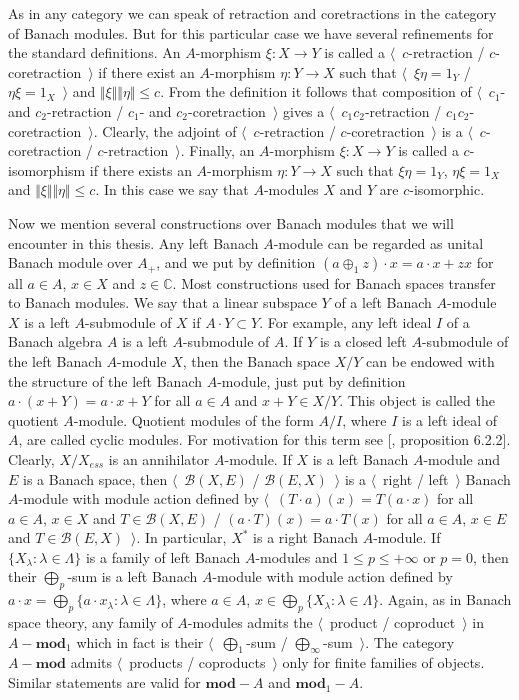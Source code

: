 As in any category we can speak of retraction and	 coretractions in the category of Banach modules. But for this particular case we have several refinements for the standard definitions. An $A$-morphism $\xi:X\to Y$ is called a $\langle$~$c$-retraction / $c$-coretraction~$\rangle$ if there exist an $A$-morphism $\eta:Y\to X$ such that $\langle$~$\xi\eta=1_Y$ / $\eta\xi=1_X$~$\rangle$ and $\Vert\xi\Vert\Vert\eta\Vert\leq c$. From the definition it follows that composition of $\langle$~$c_1$- and $c_2$-retraction / $c_1$- and $c_2$-coretraction~$\rangle$ gives a $\langle$~$c_1c_2$-retraction / $c_1c_2$-coretraction~$\rangle$. Clearly, the adjoint of $\langle$~$c$-retraction / $c$-coretraction~$\rangle$ is a $\langle$~$c$-coretraction / $c$-retraction~$\rangle$. Finally, an $A$-morphism $\xi:X\to Y$ is called a $c$-isomorphism if there exists an $A$-morphism $\eta:Y\to X$ such that $\xi\eta=1_Y$, $\eta\xi=1_X$ and $\Vert\xi\Vert\Vert\eta\Vert\leq c$. In this case we say that $A$-modules $X$ and $Y$ are $c$-isomorphic.

Now we mention several constructions over Banach modules that we will encounter in this thesis.  Any left Banach $A$-module can be regarded as unital Banach module over $A_+$, and we put by definition $(a\oplus_1 z)\cdot x=a\cdot x+zx$ for all $a\in A$, $x\in X$ and $z\in\mathbb{C}$. Most constructions used for Banach spaces transfer to Banach modules.  We say that a linear subspace $ Y$ of a left Banach $A$-module $X$ is a left $A$-submodule of $X$ if $A\cdot Y\subset Y$. For example, any left ideal $I$ of a Banach algebra $A$ is a left $A$-submodule of $A$. If $Y$ is a closed left $A$-submodule of the left Banach $A$-module $X$, then the Banach space $X/Y$ can be endowed with the structure of the left Banach $A$-module, just put by definition $a\cdot(x+Y)=a\cdot x+Y$ for all $a\in A$ and $x+Y\in X/Y$. This object is called the quotient $A$-module.  Quotient modules of the form $A/I$, where $I$ is a left ideal of $A$, are called cyclic modules. For motivation for this term see [\cite{HelBanLocConvAlg}, proposition 6.2.2]. Clearly, $X/X_{ess}$ is an annihilator $A$-module. If $X$ is a left Banach $A$-module and $E$ is a Banach space, then $\langle$~$\mathcal{B}(X,E)$ / $\mathcal{B}(E,X)$~$\rangle$ is a $\langle$~right / left~$\rangle$ Banach $A$-module with module action defined by $\langle$~$(T\cdot a)(x)=T(a\cdot x)$ for all $a\in A$, $x\in X$ and $T\in\mathcal{B}(X, E)$ / $(a\cdot T)(x)=a\cdot T(x)$ for all $a\in A$, $x\in E$ and $T\in\mathcal{B}(E, X)$~$\rangle$. In particular, $X^*$ is a right Banach $A$-module. If $\{X_\lambda:\lambda\in\Lambda\}$ is a family of left Banach $A$-modules and $1\leq p\leq +\infty$ or $p=0$, then their $\bigoplus_p$-sum is a left Banach $A$-module with module action defined by $a\cdot x=\bigoplus_p\{ a\cdot x_\lambda:\lambda\in\Lambda\}$, where $a\in A$, $x\in\bigoplus_p\{ X_\lambda:\lambda\in\Lambda\}$. Again, as in Banach space theory, any family of $A$-modules admits the $\langle$~product / coproduct~$\rangle$ in $A-\mathbf{mod}_1$ which in fact is their $\langle$~$\bigoplus_1$-sum / $\bigoplus_\infty$-sum~$\rangle$. The category $A-\mathbf{mod}$ admits $\langle$~products / coproducts~$\rangle$ only for finite families of objects. Similar statements are valid for $\mathbf{mod}-A$ and $\mathbf{mod}_1-A$.


